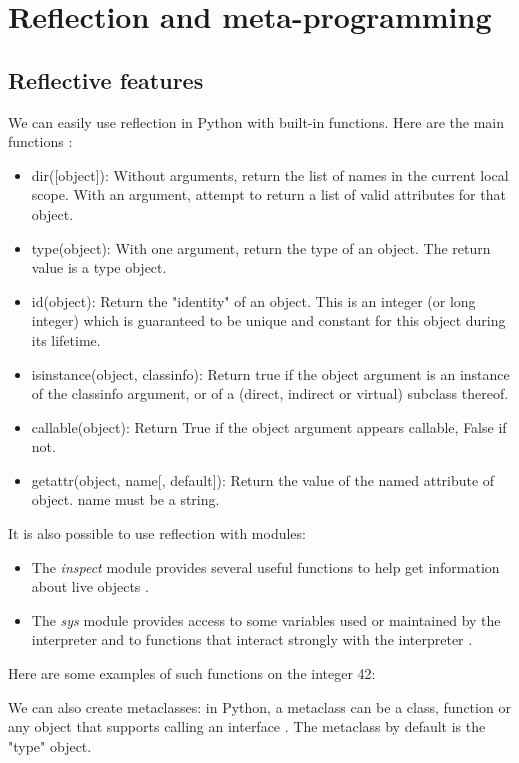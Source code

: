 \section{Reflection and meta-programming}
\subsection{Reflective features}
\label{reflection}
We can easily use reflection in Python with built-in functions. Here are the main functions \cite{python_doc_functions}:
\begin{itemize}
    \item dir([object]): Without arguments, return the list of names in the current local scope. With an argument, attempt to return a list of valid attributes for that object.
    \item type(object): With one argument, return the type of an object. The return value is a type object.
    \item id(object): Return the "identity" of an object. This is an integer (or long integer) which is guaranteed to be unique and constant for this object during its lifetime.
    \item isinstance(object, classinfo): Return true if the object argument is an instance of the classinfo argument, or of a (direct, indirect or virtual) subclass thereof.
    \item callable(object): Return True if the object argument appears callable, False if not.
    \item getattr(object, name[, default]): Return the value of the named attribute of object. name must be a string.
\end{itemize}

It is also possible to use reflection with modules:
\begin{itemize}
    \item The \textit{inspect} module provides several useful functions to help get information about live objects \cite{python_doc_inspect}. \item The \textit{sys} module provides access to some variables used or maintained by the interpreter and to functions that interact strongly with the interpreter \cite{python_doc_sys}.
\end{itemize}

Here are some examples of such functions on the integer 42:


We can also create metaclasses: in Python, a metaclass can be a class, function or any object that supports calling an interface \cite{pythoncentral_metaclasses}. The metaclass by default is the "type" object.

